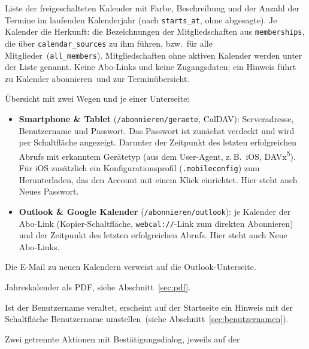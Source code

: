 \documentclass[a4paper,fontsize=10pt]{scrartcl}
\newcommand{\code}[1]{\texttt{#1}}
\begin{document}
\begin{description}[style=nextline, leftmargin=1.2cm]
  \item[Startseite \glqq Meine Kalender\grqq\ (\code{/})]
    Liste der freigeschalteten Kalender mit Farbe, Beschreibung und der
    Anzahl der Termine im laufenden Kalenderjahr (nach \code{starts\_at},
    ohne abgesagte). Je Kalender die Herkunft: die Bezeichnungen der
    Mitgliedschaften aus \code{memberships}, die über
    \code{calendar\_sources} zu ihm führen, bzw.\ \glqq für alle
    Mitglieder\grqq\ (\code{all\_members}). Mitgliedschaften ohne aktiven
    Kalender werden unter der Liste genannt. Keine Abo-Links und keine
    Zugangsdaten; ein Hinweis führt zu \glqq Kalender abonnieren\grqq\ und
    zur Terminübersicht.
  \item[Kalender abonnieren (\code{/abonnieren})]
    Übersicht mit zwei Wegen und je einer Unterseite:
    \begin{itemize}
      \item \textbf{Smartphone \& Tablet} (\code{/abonnieren/geraete},
            CalDAV): Serveradresse, Benutzername und Passwort. Das Passwort
            ist zunächst verdeckt und wird per Schaltfläche angezeigt.
            Darunter der Zeitpunkt des letzten erfolgreichen Abrufs mit
            erkanntem Gerätetyp (aus dem User-Agent, z.\,B.\ \glqq iOS\grqq,
            \glqq DAVx\textsuperscript{5}\grqq). Für iOS zusätzlich ein
            Konfigurationsprofil (\code{.mobileconfig}) zum Herunterladen,
            das den Account mit einem Klick einrichtet. Hier steht auch
            \glqq Neues Passwort\grqq.
      \item \textbf{Outlook \& Google Kalender} (\code{/abonnieren/outlook}):
            je Kalender der Abo-Link (Kopier-Schaltfläche,
            \code{webcal://}-Link zum direkten Abonnieren) und der Zeitpunkt
            des letzten erfolgreichen Abrufs. Hier steht auch \glqq Neue
            Abo-Links\grqq.
    \end{itemize}
    Die E-Mail zu neuen Kalendern
    verweist auf die Outlook-Unterseite.
  \item[Terminübersicht]
    Jahreskalender als PDF, siehe Abschnitt~\ref{sec:pdf}.
  \item[Benutzername]
    Ist der Benutzername veraltet, erscheint auf der Startseite ein Hinweis
    mit der Schaltfläche \glqq Benutzername umstellen\grqq\ (siehe
    Abschnitt~\ref{sec:benutzernamen}).
  \item[Neu generieren]
    Zwei getrennte Aktionen mit Bestätigungsdialog, jeweils auf der

\end{description}
\end{document}
